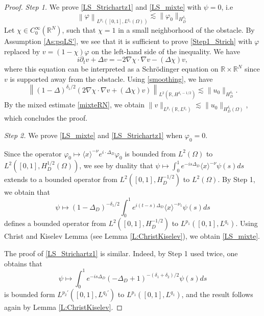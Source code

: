\documentclass[10pt,leqno]{amsart}
\theoremstyle{definition}%
\theoremstyle{remark}
\numberwithin{equation}{section}
\newcommand{\R}{\mathbb{R}}
\renewcommand{\^}{\widehat}%
\newcommand{\la}{\langle}
\newcommand{\ra}{\rangle}
\begin{document}
\begin{proof}
\emph{Step 1.} We prove \eqref{LS_Strichartz1} and \eqref{LS_mixte} with $\psi=0$, i.e
\begin{equation}
\label{Step1_Strich}
\left\|\varphi\right\|_{L^{p_1}\left([0,1],L^{q_1}(\Omega)\right)}\lesssim \|\varphi_0\|_{H_D^{\delta_1}}
\end{equation}
Let $\chi\in C_0^{\infty}(\R^N)$, such that $\chi=1$ in a small neighborhood of the obstacle. By Assumption \ref{As:pqLS'}, we see that it is sufficient to prove \eqref{Step1_Strich} with $\varphi$ replaced by $v=(1-\chi)\varphi$ on the left-hand side of the inequality. We have
$$i\partial_tv+\Delta v=-2\nabla \chi\cdot\nabla v-(\Delta \chi)v,$$
where this equation can be interpreted as a Schr\"odinger equation on $\R\times \R^N$ since $v$ is supported away from the obstacle. Using \eqref{smoothing}, we have
$$  \left\|(1-\Delta)^{\delta_1/2}\left(2\nabla \chi\cdot\nabla v+(\Delta \chi)v\right)\right\|_{L^2(\R,H^{\delta_1-1/2})}\lesssim \|u_0\|_{H_D^{\delta_1}}.$$
By the mixed estimate \eqref{mixteRN}, we obtain $\|v\|_{L^{p_1}(\R,L^{q_1})}\lesssim \|u_0\|_{H_D^{\delta_1}(\Omega)}$, which concludes the proof.


\emph{Step 2.} We prove \eqref{LS_mixte} and \eqref{LS_Strichartz1}  when $\varphi_0=0$.

Since the operator $\varphi_0\mapsto \la x \ra^{-\nu}e^{i\cdot\Delta_D}\varphi_0$ is bounded from $L^2(\Omega)$ to $L^2([0,1],H^{1/2}_D(\Omega))$, we see by duality that
$\psi\mapsto \int_0^1e^{-is\Delta_D}\la x\ra^{-\nu}\psi(s)ds$ extends to a bounded operator from $L^2([0,1],H^{-1/2}_D)$ to $L^2(\Omega)$. By Step 1, we obtain that
$$\psi\mapsto (1-\Delta_D)^{-\delta_1/2} \int_0^1 e^{i(t-s)\Delta_D} \la x\ra^{-\nu_1}\psi(s)ds$$
defines a bounded operator from $L^2([0,1],H_D^{-1/2})$ to $L^{p_1}([0,1],L^{q_1})$. Using Christ and Kiselev Lemma (see Lemma \ref{L:ChristKiselev}), we obtain \eqref{LS_mixte}.

The proof of \eqref{LS_Strichartz1} is similar. Indeed, by Step 1 used twice, one obtains that
$$\psi\mapsto \int_0^{1}e^{-is\Delta_D}(-\Delta_D+1)^{-(\delta_1+\delta_2)/2}\psi(s)ds$$
is bounded form $L^{p_2'}([0,1],L^{q_2'})$ to $L^{p_1}([0,1],L^{q_1})$, and the result follows again by Lemma \ref{L:ChristKiselev}.
\end{proof}
\end{document}
